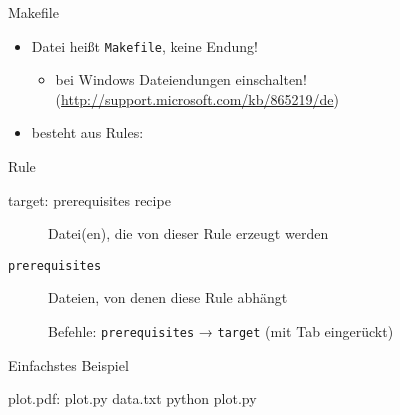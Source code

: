 \begin{frame}[fragile]{Makefile}
  \begin{itemize}
    \item Datei heißt \texttt{Makefile}, keine Endung!
      \begin{itemize}
        \item bei Windows Dateiendungen einschalten! (\url{http://support.microsoft.com/kb/865219/de})
      \end{itemize}
    \item besteht aus Rules:
  \end{itemize}
  \begin{block}{Rule}
    \centering
    \begin{lstmake}
      target: prerequisites
          recipe
    \end{lstmake}
  \end{block}
  \begin{description}
    \item[\texttt{\hphantom{prerequisites}}] Datei(en), die von dieser Rule erzeugt werden
    \item[\texttt{prerequisites}]                         Dateien, von denen diese Rule abhängt
    \item[\texttt{\hphantom{prerequisites}}] Befehle: \texttt{prerequisites} → \texttt{target} (mit Tab eingerückt)
  \end{description}
\end{frame}

\begin{frame}[fragile]{Einfachstes Beispiel}
  \begin{center}
    \begin{lstmake}
      plot.pdf: plot.py data.txt
          python plot.py
    \end{lstmake}
  \end{center}
\end{frame}


